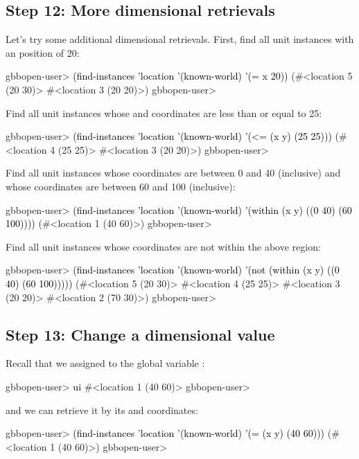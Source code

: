 \documentclass[10pt,twoside,english,pdftex]{article}
\begin{document}
\subsection*{Step 12: More dimensional retrievals}

%
%
Let's try some additional dimensional retrievals.  First, find all
 unit instances with an  position of 20:
%
\W\supp
\begin{example}
\textcolor{darkergray}{%
  gbbopen-user> \textcolor{black}{(find-instances 'location '(known-world)
                  '(= x 20))}
   (#<location 5 (20 30)> #<location 3 (20 20)>)
  gbbopen-user>}
\end{example}
%
Find all  unit instances whose  and 
coordinates are less than or equal to 25:
%
\W\supp\notpretop
\begin{example}
\textcolor{darkergray}{%
  gbbopen-user> \textcolor{black}{(find-instances 'location '(known-world)
                  '(<= (x y) (25 25)))}
  (#<location 4 (25 25)> #<location 3 (20 20)>)
  gbbopen-user>}
\end{example}
%
Find all  unit instances whose  coordinates are
between 0 and 40 (inclusive) and whose  coordinates are between 60 and
100 (inclusive):
%
\W\supp\notpretop
\begin{example}
\textcolor{darkergray}{%
  gbbopen-user> \textcolor{black}{(find-instances 'location '(known-world)
                  '(within (x y) ((0 40) (60 100))))}
  (#<location 1 (40 60)>)
  gbbopen-user>}
\end{example}
%
Find all  unit instances whose coordinates are not
within the above region:
%
\W\supp\notpretop
\begin{example}
\textcolor{darkergray}{%
  gbbopen-user> \textcolor{black}{(find-instances 'location '(known-world)
                  '(not (within (x y) ((0 40) (60 100)))))}
  (#<location 5 (20 30)> #<location 4 (25 25)> #<location 3 (20 20)>
   #<location 2 (70 30)>)
  gbbopen-user>}
\end{example}

\subsection*{Step 13: Change a dimensional value}

%
%
Recall that we assigned   to the global variable
:
%
\W\supp
\begin{example}
\textcolor{darkergray}{%
  gbbopen-user> \textcolor{black}{ui}
  #<location 1 (40 60)>
  gbbopen-user>}
\end{example}
%  
and we can retrieve it by its  and  coordinates:
%
\W\supp\notpretop
\begin{example}
\textcolor{darkergray}{%
  gbbopen-user> \textcolor{black}{(find-instances 'location '(known-world)
                  '(= (x y) (40 60)))}
  (#<location 1 (40 60)>)
  gbbopen-user>}
\end{example}
\end{document}
